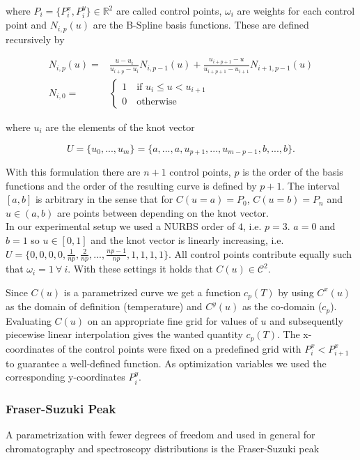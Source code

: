 \documentclass{scrartcl}[12pt, halfparskip]
\begin{document}
where $P_i = \{ P_i^x, P_i^y \} \in \mathbb{R}^2$ are called control points, $\omega_i$ are weights for each control point and $N_{i,p}(u)$ are the B-Spline basis functions. These are defined recursively by

\begin{align}
	N_{i,p}(u) = & \frac{u - u_i}{u_{i+p} - u_i} N_{i,p-1}(u) + \frac{u_{i+p+1} - u}{u_{i+p+1} - u_{i+1}} N_{i+1,p-1}(u) \label{eq:NURBS_basis_polynomial} \\[1ex]
	N_{i,0} = &
	\begin{cases}
		1 \quad \text{if } u_i \le u < u_{i+1} \\
		0 \quad \text{otherwise}
	\end{cases} \nonumber
\end{align}

where $u_i$ are the elements of the knot vector

\begin{equation}
	U = \{u_0,...,u_m\}=\{a,...,a,u_{p+1},...,u_{m-p-1},b,...,b\}.
\end{equation}

With this formulation there are $n+1$ control points, $p$ is the order of the basis functions and the order of the resulting curve is defined by $p+1$. The interval $[a,b]$ is arbitrary in the sense that for $C(u=a)=P_0$,  $C(u=b)=P_n$ and $u \in (a,b)$ are points between depending on the knot vector.\\

In our experimental setup we used a NURBS order of $4$, i.e. $p=3$. $a=0$ and $b=1$ so $u \in [0,1]$ and the knot vector is linearly increasing, i.e. $U = \{ 0,0,0,0,\frac{1}{n p},\frac{2}{n p},...,\frac{n p - 1}{n p},1,1,1,1 \}$. All control points contribute equally such that $\omega_i=1 \ \forall \ i$. With these settings it holds that $C(u) \in \mathcal{C}^2$.

Since $C(u)$ is a parametrized curve we get a function $c_p(T)$ by using $C^x(u)$ as the domain of definition (temperature) and $C^y(u)$ as the co-domain ($c_p$). Evaluating $C(u)$ on an appropriate fine grid for values of $u$ and subsequently piecewise linear interpolation gives the wanted quantity $c_p(T)$.
The x-coordinates of the control points were fixed on a predefined grid with $P_i^x < P_{i+1}^x$ to guarantee a well-defined function.
As optimization variables we used the corresponding y-coordinates $P_i^y$.

\subsubsection{Fraser-Suzuki Peak}
A parametrization with fewer degrees of freedom and used in general for chromatography and spectroscopy distributions is the Fraser-Suzuki peak \cite{fraser_suzuki_1} \cite{fraser_suzuki_many_fcts}
\end{document}
